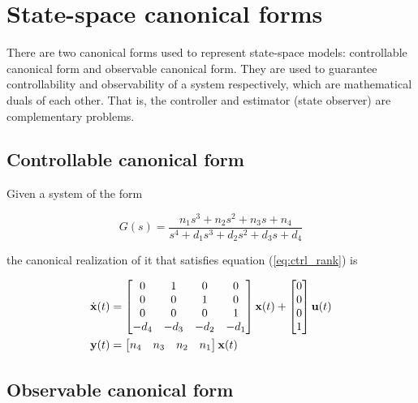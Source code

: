 
\chapter{State-space canonical forms}

There are two canonical forms used to represent state-space \glspl{model}:
controllable canonical form and observable canonical form. They are used to
guarantee controllability and observability of a \gls{system} respectively,
which are mathematical duals of each other. That is, the controller and
estimator (\gls{state} \gls{observer}) are complementary problems.

\section{Controllable canonical form} \label{sec:ctrl_canon}

Given a \gls{system} of the form

\begin{equation} \label{eq:ctrl_obsv_tf}
  G(s) = \frac{n_1 s^3 + n_2 s^2 + n_3 s + n_4}
    {s^4 + d_1 s^3 + d_2 s^2 + d_3 s + d_4}
\end{equation}

the canonical \gls{realization} of it that satisfies equation
(\ref{eq:ctrl_rank}) is

\begin{align}
  \dot{\mathbf{x}}(t) &=
  \begin{bmatrix}
    0 & 1 & 0 & 0 \\
    0 & 0 & 1 & 0 \\
    0 & 0 & 0 & 1 \\
    -d_4 & -d_3 & -d_2 & -d_1
  \end{bmatrix}
  \mathbf{x}(t) +
  \begin{bmatrix}
    0 \\
    0 \\
    0 \\
    1
  \end{bmatrix}
  \mathbf{u}(t) \\
  \mathbf{y}(t) &=
  \begin{bmatrix}
    n_4 & n_3 & n_2 & n_1
  \end{bmatrix}
  \mathbf{x}(t)
\end{align}

\section{Observable canonical form} \label{sec:obsv_canon}


